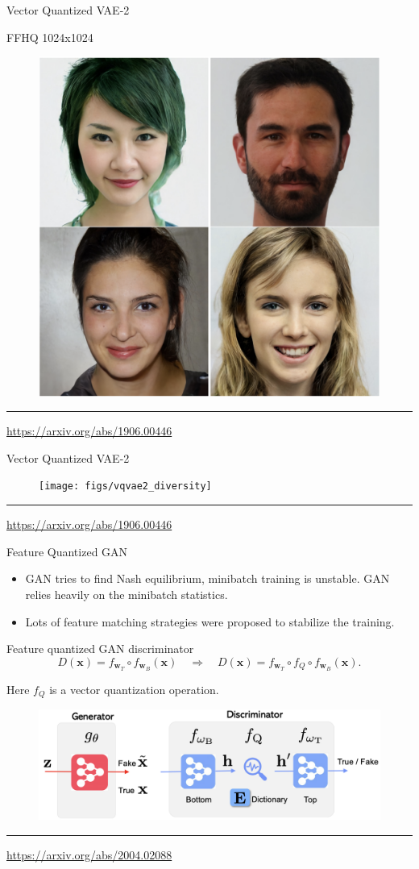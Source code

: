 \documentclass{beamer}
\newcommand{\bw}{\mathbf{w}}
\newcommand{\bx}{\mathbf{x}}
\begin{document}
\begin{frame}{Vector Quantized VAE-2}
	\begin{block}{FFHQ 1024x1024}
	\begin{figure}
		\centering
		\includegraphics[width=0.63\linewidth]{figs/vqvae2_faces}
	\end{figure}
	\end{block}
	\vfill
	\hrule\medskip
	{\scriptsize \href{https://arxiv.org/abs/1906.00446}{https://arxiv.org/abs/1906.00446}} 
\end{frame}
\begin{frame}{Vector Quantized VAE-2}
	\begin{figure}
		\centering
		\texttt{[image: figs/vqvae2\_diversity]}
	\end{figure}
	\vfill
	\hrule\medskip
	{\scriptsize \href{https://arxiv.org/abs/1906.00446}{https://arxiv.org/abs/1906.00446}} 
\end{frame}
\begin{frame}{Feature Quantized GAN}
	\begin{itemize}
		\item GAN tries to find Nash equilibrium, minibatch training is unstable. GAN relies heavily on the minibatch statistics.
		\item Lots of feature matching strategies were proposed to stabilize the training. 
	\end{itemize}
	\begin{block}{Feature quantized GAN discriminator}
		\[
			D(\bx) = f_{\bw_T} \circ f_{\bw_B}(\bx) \quad \Rightarrow \quad D(\bx) = f_{\bw_T} \circ f_Q \circ f_{\bw_B}(\bx). 
		\]
	\end{block}
	Here $f_Q$ is a vector quantization operation.
	\begin{figure}
		\centering
		\includegraphics[width=0.7\linewidth]{figs/fqgan}
	\end{figure}
	\vfill
	\hrule\medskip
	{\scriptsize \href{https://arxiv.org/abs/2004.02088}{https://arxiv.org/abs/2004.02088}} 
\end{frame}
\end{document}
